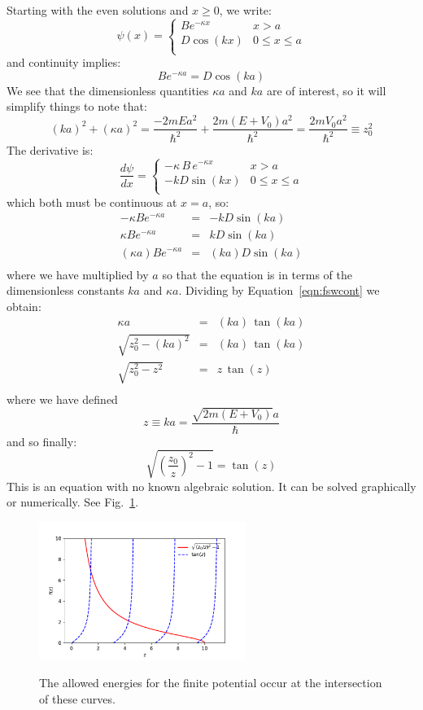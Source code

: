 \documentclass[12pt]{book}
\begin{document}
Starting with the even solutions and $x\geq0$, we write:
$$\psi(x) = \begin{cases}
Be^{\displaystyle -\kappa x} & x > a \\
D \cos(kx) & 0 \leq x \leq a \\
\end{cases}$$
and continuity implies:
\begin{equation}
\label{eqn:fswcont}
B e^{-\kappa a} = D \cos(ka)
\end{equation}
We see that the dimensionless quantities $\kappa a$ and $ka$ are of interest, so it will simplify things to note that:
$$(ka)^2+(\kappa a)^2 = \frac{-2mEa^2}{\hbar^2} + \frac{2m(E+V_0)a^2}{\hbar^2} = 
\frac{2mV_0a^2}{\hbar^2} \equiv z_0^2$$
The derivative is:
$$\frac{d\psi}{dx} = \begin{cases}
-\kappa \, B \, e^{\displaystyle -\kappa x} & x > a \\
-kD \sin(kx) & 0 \leq x \leq a \\
\end{cases}$$
which both must be continuous at $x=a$, so:
\begin{eqnarray*}
-\kappa B e^{-\kappa a} &=& -k D \sin(ka)\\
 \kappa B e^{-\kappa a} &=& k D \sin(ka)\\
 (\kappa a) B e^{-\kappa a} &=& (ka) D \sin(ka)\\
\end{eqnarray*}
where we have multiplied by $a$ so that the equation is in terms of the dimensionless constants $ka$ and $\kappa a$.  Dividing by Equation~\ref{eqn:fswcont} we obtain:
\begin{eqnarray*}
\kappa a &=& (ka) \, \tan(ka) \\
\sqrt{z_0^2-(ka)^2} &=& (ka) \, \tan(ka) \\
\sqrt{z_0^2-z^2} &=& z \, \tan(z) \\
\end{eqnarray*}
where we have defined 
$$z \equiv ka = \frac{\sqrt{2m(E+V_0)}a}{\hbar}$$
and so finally:
\begin{equation}
\sqrt{\left(\frac{z_0}{z}\right)^2-1} = \tan(z) 
\end{equation}
This is an equation with no known algebraic solution.  It can be solved graphically or numerically.  See Fig.~\ref{fig:finitewell}.
\begin{figure}[thb]
\begin{center}
{\includegraphics[width=0.60\textwidth]{python/finitewell.pdf}}
\end{center}
\caption{\label{fig:finitewell} The allowed energies for the finite potential occur at the intersection of these curves.}
\end{figure}
\end{document}
